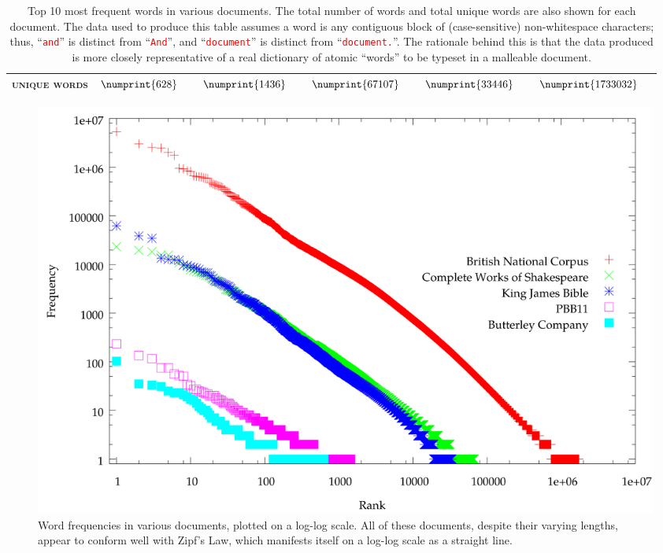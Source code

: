 \begin{table}
\begin{tabular}{rrlrlrlrlrl}
    \midrule
    \textsc{unique words} & $\numprint{628}$  & & $\numprint{1436}$ & & $\numprint{67107}$  & & $\numprint{33446}$  & & $\numprint{1733032}$  & \\ 
    \bottomrule    
  \end{tabular}
  \caption[Word frequencies in various documents]{Top 10 most frequent words in various documents. The total number of words and total unique words are also shown for each document. The data used to produce this table assumes a word is any contiguous block of (case-sensitive) non-whitespace characters; thus, ``\texttt{\textcolor{red}{and}}'' is distinct from ``\texttt{\textcolor{red}{And}}'', and ``\texttt{\textcolor{red}{document}}'' is distinct from ``\texttt{\textcolor{red}{document.}}''. The rationale behind this is that the data produced is more closely representative of a real dictionary of atomic ``words'' to be typeset in a malleable document.}
  \label{tab:wordfreq}
\end{table}

\begin{figure}
  \begin{center}
  \includegraphics[width=\textwidth]{gnuplot/wordfreq-raster}
  \end{center}
  \caption[Word frequencies in various documents]{Word frequencies in various documents, plotted on a log-log scale. All of these documents, despite their varying lengths, appear to conform well with Zipf's Law, which manifests itself on a log-log scale as a straight line.}
  \label{fig:wordfreq}
\end{figure}


